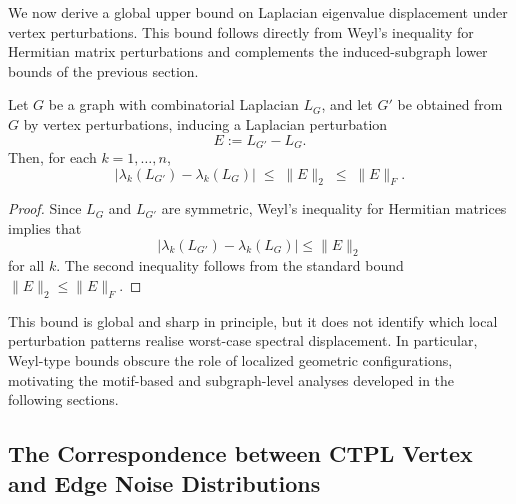 \documentclass[
  11pt,
  letterpaper]{siamart251216}
\begin{document}
We now derive a global upper bound on Laplacian eigenvalue displacement
under vertex perturbations. This bound follows directly from Weyl's
inequality for Hermitian matrix perturbations and complements the
induced-subgraph lower bounds of the previous section.

\begin{theorem}\label{thm:weyl-upper-bound}
Let $G$ be a graph with combinatorial Laplacian $L_G$, and let $G'$ be obtained from $G$ by vertex perturbations, inducing a Laplacian perturbation
$$
E := L_{G'} - L_G .
$$
Then, for each $k=1,\dots,n$,
\begin{equation}\label{eq:weyl-bound}
\bigl|\lambda_k(L_{G'}) - \lambda_k(L_G)\bigr|
\;\le\; \|E\|_2
\;\le\; \|E\|_F .
\end{equation}
\end{theorem}

\begin{proof}
Since $L_G$ and $L_{G'}$ are symmetric, Weyl's inequality for Hermitian matrices \cite{Weyl1912,StewartSun1990,Bhatia1997} implies that
$$
\bigl|\lambda_k(L_{G'}) - \lambda_k(L_G)\bigr| \le \|E\|_2
$$
for all $k$.
The second inequality follows from the standard bound $\|E\|_2 \le \|E\|_F$.
\end{proof}

This bound is global and sharp in principle, but it does not identify
which local perturbation patterns realise worst-case spectral
displacement. In particular, Weyl-type bounds obscure the role of
localized geometric configurations, motivating the motif-based and
subgraph-level analyses developed in the following sections.

\subsection{\texorpdfstring{The Correspondence between \ac{CTPL} Vertex
and Edge Noise
Distributions}{The Correspondence between  Vertex and Edge Noise Distributions}}\label{sec-tailweights}
\end{document}
